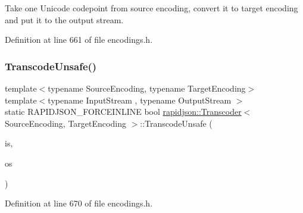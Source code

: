 Take one Unicode codepoint from source encoding, convert it to target encoding and put it to the output stream. 



Definition at line 661 of file encodings.\+h.


\begin{DoxyCode}{0}

\end{DoxyCode}
\mbox{\label{structrapidjson_1_1_transcoder_a43f7d4e8a24db9d09958b9be41257033}} 
\subsubsection{\texorpdfstring{TranscodeUnsafe()}{TranscodeUnsafe()}}
{\footnotesize\ttfamily template$<$typename Source\+Encoding, typename Target\+Encoding$>$ \\
template$<$typename Input\+Stream , typename Output\+Stream $>$ \\
static R\+A\+P\+I\+D\+J\+S\+O\+N\+\_\+\+F\+O\+R\+C\+E\+I\+N\+L\+I\+NE bool \mbox{\hyperlink{structrapidjson_1_1_transcoder}{rapidjson\+::\+Transcoder}}$<$ Source\+Encoding, Target\+Encoding $>$\+::Transcode\+Unsafe (\begin{DoxyParamCaption}\item[{Input\+Stream \&}]{is,  }\item[{Output\+Stream \&}]{os }\end{DoxyParamCaption})\hspace{0.3cm}{\ttfamily [static]}}



Definition at line 670 of file encodings.\+h.


